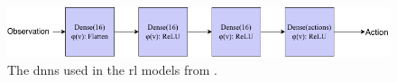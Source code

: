 \begin{figure}[htp!]
    \centering
    \includegraphics[width=\textwidth]{./fig/nn.png}
    \caption{The \glspl{dnn} used in the \gls{rl} models from .}
    \label{fig:neuralnetwork}
\end{figure}
